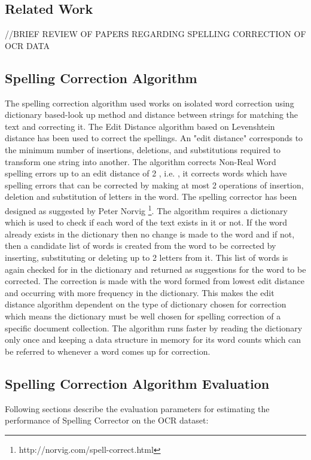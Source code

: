 \documentclass[letterpaper,11pt]{report}
\begin{document}
\subsection{Related Work}
//BRIEF REVIEW OF PAPERS REGARDING SPELLING CORRECTION OF OCR DATA

\subsection{Spelling Correction Algorithm}

The spelling correction algorithm used works on isolated word correction using dictionary based-look up method and distance between strings for matching the text and correcting it.
The Edit Distance algorithm based on Levenshtein distance\cite{levenshtein1966binary} has been used to correct the spellings. An "edit distance" corresponds to the minimum number of insertions, deletions, and substitutions required to transform one string into another. The algorithm corrects Non-Real Word spelling errors up to an edit distance of 2 , i.e. , it corrects words which have spelling errors that can be corrected by making at most 2 operations of insertion, deletion and substitution of letters in the word.
The spelling corrector has been designed as suggested by Peter Norvig \footnote{ http://norvig.com/spell-correct.html}. The algorithm requires a dictionary which is used to check if each word of the text exists in it or not. If the word already exists in the dictionary then no change is made to the word and if not, then a candidate list of words is created from the word to be corrected by inserting, substituting or deleting up to 2 letters from it. This list of words is again checked for in the dictionary and returned as suggestions for the word to be corrected. The correction is made with the word formed from lowest edit distance and occurring with more frequency in the dictionary. This makes the edit distance algorithm dependent on the type of dictionary chosen for correction which means the dictionary must be well chosen for spelling correction of a specific document collection. The algorithm runs faster by reading the dictionary only once and keeping a data structure in memory for its word counts which can be referred to whenever a word comes up for correction.

\subsection{Spelling Correction Algorithm Evaluation}
Following sections describe the evaluation parameters for estimating the performance of Spelling Corrector on the OCR dataset:
\end{document}
